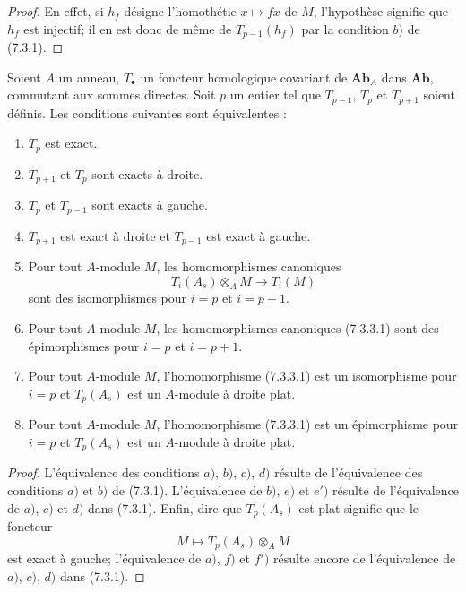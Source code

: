 \begin{proof}
En effet, si $h_f$ désigne l'homothétie $x\mapsto fx$ de $M$, l'hypothèse
signifie que $h_f$ est injectif; il en est donc de même de $T_{p-1}(h_f)$ par
la condition $b)$ de (7.3.1).
\end{proof}

\begin{proposition}[7.3.3]
Soient $A$ un anneau, $T_\bullet$ un foncteur homologique covariant de
$\mathbf{Ab}_A$ dans $\mathbf{Ab}$, commutant aux sommes directes. Soit $p$ un
entier tel que $T_{p-1}$, $T_p$ et $T_{p+1}$ soient définis. Les conditions
suivantes sont équivalentes :
\begin{enumerate}
  \item[a)] $T_p$ est exact.
  \item[b)] $T_{p+1}$ et $T_p$ sont exacts à droite.
  \item[c)] $T_p$ et $T_{p-1}$ sont exacts à gauche.
  \item[d)] $T_{p+1}$ est exact à droite et $T_{p-1}$ est exact à gauche.
  \item[e)] Pour tout $A$-module $M$, les homomorphismes canoniques
    \[
      T_i(A_s)\otimes_A M\longrightarrow T_i(M)
      \tag{7.3.3.1}\label{III.7.3.3.1.fr}
    \]
    sont des isomorphismes pour $i=p$ et $i=p+1$.
  \item[$e'$)] Pour tout $A$-module $M$, les homomorphismes canoniques
    (7.3.3.1) sont des épimorphismes pour $i=p$ et $i=p+1$.
  \item[f)] Pour tout $A$-module $M$, l'homomorphisme (7.3.3.1) est un
    isomorphisme pour $i=p$ et $T_p(A_s)$ est un $A$-module à droite plat.
  \item[$f'$)] Pour tout $A$-module $M$, l'homomorphisme (7.3.3.1) est un
    épimorphisme pour $i=p$ et $T_p(A_s)$ est un $A$-module à droite plat.
\end{enumerate}
\end{proposition}

\begin{proof}
L'équivalence des conditions $a)$, $b)$, $c)$, $d)$ résulte de l'équivalence
des conditions $a)$ et $b)$ de (7.3.1). L'équivalence de $b)$, $e)$ et $e')$
résulte de l'équivalence de $a)$, $c)$ et $d)$ dans (7.3.1). Enfin, dire que
$T_p(A_s)$ est plat signifie que le foncteur
\[
  M\mapsto T_p(A_s)\otimes_A M
\]
est exact à gauche; l'équivalence de $a)$, $f)$ et $f')$ résulte encore de
l'équivalence de $a)$, $c)$, $d)$ dans (7.3.1).
\end{proof}

